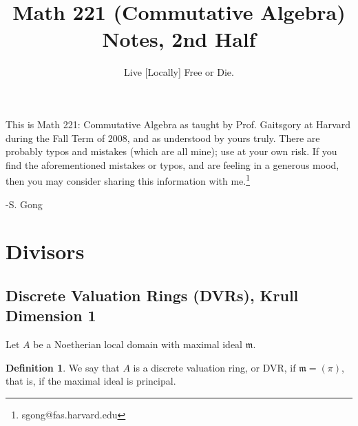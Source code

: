 \documentclass[12 pt]{article}
\theoremstyle{definition}
\newtheorem{defn}[thm]{Definition}
\renewcommand{\(}{\left(}
\renewcommand{\)}{\right)}
\newcommand\fm{{\mathfrak m}}
\begin{document}
\title{Math 221 (Commutative Algebra) Notes, 2nd Half}
\author{Live [Locally] Free or Die.}
\setcounter{tocdepth}{2}
\date{}





\begin{titlepage}


\maketitle

\vspace{2 cm}

This is Math 221: Commutative Algebra as taught by Prof. Gaitsgory at Harvard during the Fall Term of 2008, and as understood by yours truly. There are probably typos and mistakes (which are all mine); use at your own risk. If you find the aforementioned mistakes or typos, and are feeling in a generous mood, then you may consider sharing this information with me.\footnote{sgong@fas.harvard.edu}

\text{                     } -S. Gong


\end{titlepage}

\tableofcontents




\newpage

\section{Divisors}


\subsection{Discrete Valuation Rings (DVRs), Krull Dimension 1}


Let $A$ be a Noetherian local domain with maximal ideal $\fm$.

\begin{defn} We say that $A$ is a discrete valuation ring, or DVR, if $\fm=(\pi)$, that is, if the maximal ideal is principal.
\end{defn}
\end{document}
